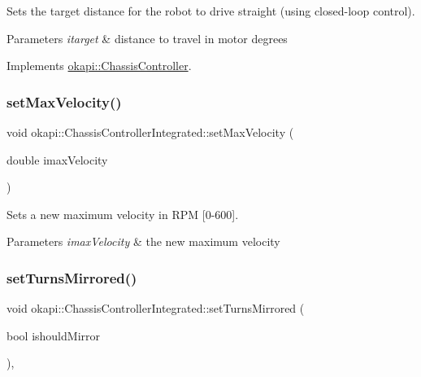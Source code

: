 Sets the target distance for the robot to drive straight (using closed-\/loop control).


\begin{DoxyParams}{Parameters}
{\em itarget} & distance to travel in motor degrees \\
\hline
\end{DoxyParams}


Implements \mbox{\hyperlink{classokapi_1_1ChassisController_a24b46ec1c42f32c0527d57738a07820a}{okapi\+::\+Chassis\+Controller}}.

\mbox{\label{classokapi_1_1ChassisControllerIntegrated_aaff13c4d1ec3e98a6e153d3602996141}} 
\subsubsection{\texorpdfstring{setMaxVelocity()}{setMaxVelocity()}}
{\footnotesize\ttfamily void okapi\+::\+Chassis\+Controller\+Integrated\+::set\+Max\+Velocity (\begin{DoxyParamCaption}\item[{double}]{imax\+Velocity }\end{DoxyParamCaption})\hspace{0.3cm}{\ttfamily [virtual]}}

Sets a new maximum velocity in R\+PM \mbox{[}0-\/600\mbox{]}.


\begin{DoxyParams}{Parameters}
{\em imax\+Velocity} & the new maximum velocity \\
\hline
\end{DoxyParams}
\mbox{\label{classokapi_1_1ChassisControllerIntegrated_a37d538f92439644efa50a226c3cefd6d}} 
\subsubsection{\texorpdfstring{setTurnsMirrored()}{setTurnsMirrored()}}
{\footnotesize\ttfamily void okapi\+::\+Chassis\+Controller\+Integrated\+::set\+Turns\+Mirrored (\begin{DoxyParamCaption}\item[{bool}]{ishould\+Mirror }\end{DoxyParamCaption})\hspace{0.3cm}{\ttfamily [override]}, {\ttfamily [virtual]}}

